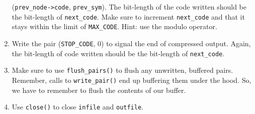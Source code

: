 \begin{enumerate}
      (\texttt{prev\_node->code}, \texttt{prev\_sym}). The bit-length of
      the code written should be the bit-length of \texttt{next\_code}.
      Make sure to increment \texttt{next\_code} and that it stays
      within the limit of \texttt{MAX\_CODE}. Hint: use the modulo
      operator.
    \item Write the pair (\texttt{STOP\_CODE}, 0) to signal the end of
      compressed output. Again, the bit-length of code written should be
      the bit-length of \texttt{next\_code}.
    \item Make sure to use \texttt{flush\_pairs()} to flush any unwritten,
      buffered pairs. Remember, calls to \texttt{write\_pair()} end up
      buffering them under the hood. So, we have to remember to flush
      the contents of our buffer.
    \item Use \texttt{close()} to close \texttt{infile} and \texttt{outfile}.
\end{enumerate}
